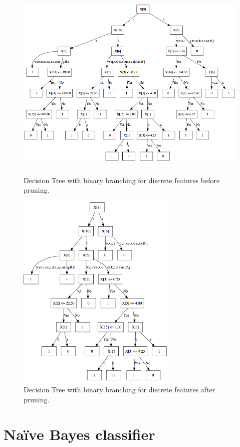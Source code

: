 \documentclass[11pt]{article}
\begin{document}
\begin{figure}[h!]
\centering
\includegraphics[height=3.75in, width=5in]{bin_before.png}
\caption{Decision Tree with binary branching for discrete features before pruning.}
\label{bin_before}
\end{figure}

\begin{figure}[h!]
\centering
\includegraphics[height=3.75in, width=3in]{bin_after.png}
\caption{Decision Tree with binary branching for discrete features after pruning.}
\label{bin_after}
\end{figure}

\clearpage

\section{Na{\"i}ve Bayes classifier}
\end{document}
